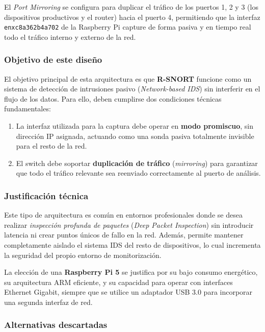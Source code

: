 \documentclass[12pt,a4paper]{report}
\begin{document}
El \textit{Port Mirroring} se configura para duplicar el tráfico de los puertos 1, 2 y 3 (los dispositivos productivos y el router) hacia el puerto 4, permitiendo que la interfaz \texttt{enxc8a362b4a702} de la Raspberry Pi capture de forma pasiva y en tiempo real todo el tráfico interno y externo de la red.

\subsubsection{Objetivo de este diseño}

El objetivo principal de esta arquitectura es que \textbf{R-SNORT} funcione como un sistema de detección de intrusiones pasivo (\textit{Network-based IDS}) sin interferir en el flujo de los datos. Para ello, deben cumplirse dos condiciones técnicas fundamentales:

\begin{enumerate}
	\item La interfaz utilizada para la captura debe operar en \textbf{modo promiscuo}, sin dirección IP asignada, actuando como una sonda pasiva totalmente invisible para el resto de la red.
	\item El switch debe soportar \textbf{duplicación de tráfico} (\textit{mirroring}) para garantizar que todo el tráfico relevante sea reenviado correctamente al puerto de análisis.
\end{enumerate}

\subsubsection{Justificación técnica}

Este tipo de arquitectura es común en entornos profesionales donde se desea realizar \textit{inspección profunda de paquetes} (\textit{Deep Packet Inspection}) sin introducir latencia ni crear puntos únicos de fallo en la red. Además, permite mantener completamente aislado el sistema IDS del resto de dispositivos, lo cual incrementa la seguridad del propio entorno de monitorización.\newline

La elección de una \textbf{Raspberry Pi 5} se justifica por su bajo consumo energético, su arquitectura ARM eficiente, y su capacidad para operar con interfaces Ethernet Gigabit, siempre que se utilice un adaptador USB 3.0 para incorporar una segunda interfaz de red.

\subsubsection{Alternativas descartadas}
\end{document}

